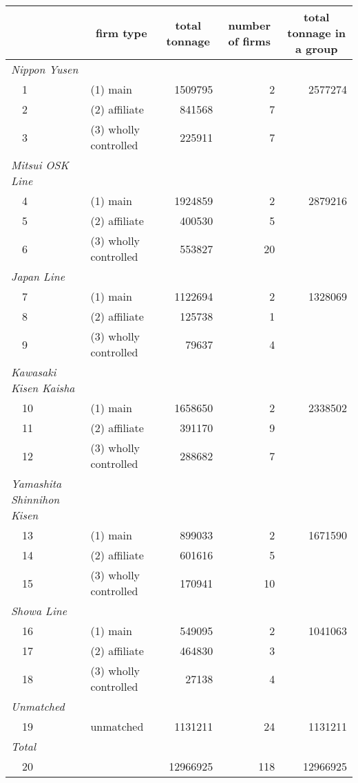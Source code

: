 \begin{tabular}{llrrr}
\toprule
\multicolumn{1}{l}{}&\multicolumn{1}{c}{firm type}&\multicolumn{1}{c}{total tonnage}&\multicolumn{1}{c}{number of firms}&\multicolumn{1}{c}{total tonnage in a group}\tabularnewline
\midrule
{\itshape Nippon Yusen}&&&&\tabularnewline
~~1&(1) main&1509795&2&2577274\tabularnewline
~~2&(2) affiliate&841568&7&\tabularnewline
~~3&(3) wholly controlled&225911&7&\tabularnewline
\midrule
{\itshape Mitsui OSK Line}&&&&\tabularnewline
~~4&(1) main&1924859&2&2879216\tabularnewline
~~5&(2) affiliate&400530&5&\tabularnewline
~~6&(3) wholly controlled&553827&20&\tabularnewline
\midrule
{\itshape Japan Line}&&&&\tabularnewline
~~7&(1) main&1122694&2&1328069\tabularnewline
~~8&(2) affiliate&125738&1&\tabularnewline
~~9&(3) wholly controlled&79637&4&\tabularnewline
\midrule
{\itshape Kawasaki Kisen Kaisha}&&&&\tabularnewline
~~10&(1) main&1658650&2&2338502\tabularnewline
~~11&(2) affiliate&391170&9&\tabularnewline
~~12&(3) wholly controlled&288682&7&\tabularnewline
\midrule
{\itshape Yamashita Shinnihon Kisen}&&&&\tabularnewline
~~13&(1) main&899033&2&1671590\tabularnewline
~~14&(2) affiliate&601616&5&\tabularnewline
~~15&(3) wholly controlled&170941&10&\tabularnewline
\midrule
{\itshape Showa Line}&&&&\tabularnewline
~~16&(1) main&549095&2&1041063\tabularnewline
~~17&(2) affiliate&464830&3&\tabularnewline
~~18&(3) wholly controlled&27138&4&\tabularnewline
\midrule
{\itshape Unmatched}&&&&\tabularnewline
~~19&unmatched&1131211&24&1131211\tabularnewline
\midrule
{\itshape Total}&&&&\tabularnewline
~~20&&12966925&118&12966925\tabularnewline
\bottomrule
\end{tabular}
